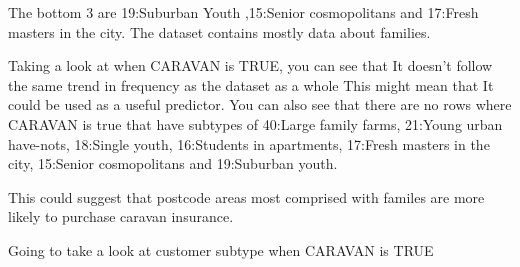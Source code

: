 \documentclass{article}\usepackage[]{graphicx}\usepackage[]{color}
\begin{document}
The bottom 3 are 19:Suburban Youth ,15:Senior cosmopolitans and 17:Fresh masters in the city. The dataset contains mostly data about families. 

Taking a look at when CARAVAN is TRUE, you can see that It doesn't follow the same trend in frequency as the dataset as a whole This might mean that It could be used as a useful predictor. You can also see that there are no rows where CARAVAN is true that have subtypes of 40:Large family farms, 21:Young urban have-nots, 18:Single youth, 16:Students in apartments, 17:Fresh masters in the city, 15:Senior cosmopolitans and 19:Suburban youth. 

This could suggest that postcode areas most comprised with familes are more likely to purchase caravan insurance. 

Going to take a look at customer subtype when CARAVAN is TRUE
\end{document}
